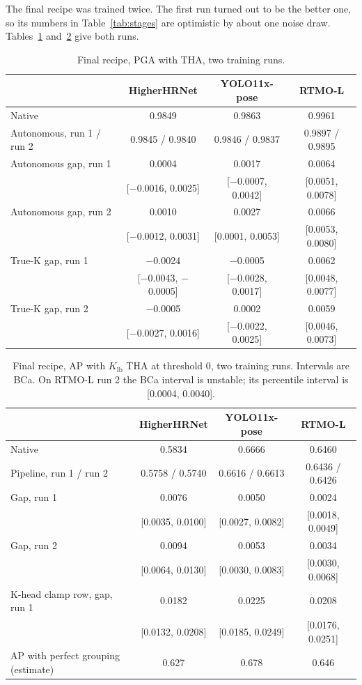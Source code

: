 \documentclass[11pt,a4paper]{article}
\newcommand{\Klb}{K_{\mathrm{lb}}}
\begin{document}
The final recipe was trained twice.
The first run turned out to be the better one, so its numbers in Table~\ref{tab:stages} are optimistic by about one
noise draw.
Tables~\ref{tab:pga} and~\ref{tab:ap} give both runs.

\begin{table}[H]
\centering
\caption{Final recipe, PGA with THA, two training runs.}
\label{tab:pga}
\begin{tabular}{@{}lccc@{}}
\toprule
& HigherHRNet & YOLO11x-pose & RTMO-L \\
\midrule
Native & 0.9849 & 0.9863 & 0.9961 \\
Autonomous, run 1 / run 2 & 0.9845 / 0.9840 & 0.9846 / 0.9837 & 0.9897 / 0.9895 \\
\addlinespace
Autonomous gap, run 1 & 0.0004 & 0.0017 & 0.0064 \\
& [$-$0.0016, 0.0025] & [$-$0.0007, 0.0042] & [0.0051, 0.0078] \\
Autonomous gap, run 2 & 0.0010 & 0.0027 & 0.0066 \\
& [$-$0.0012, 0.0031] & [0.0001, 0.0053] & [0.0053, 0.0080] \\
\addlinespace
True-K gap, run 1 & $-$0.0024 & $-$0.0005 & 0.0062 \\
& [$-$0.0043, $-$0.0005] & [$-$0.0028, 0.0017] & [0.0048, 0.0077] \\
True-K gap, run 2 & $-$0.0005 & 0.0002 & 0.0059 \\
& [$-$0.0027, 0.0016] & [$-$0.0022, 0.0025] & [0.0046, 0.0073] \\
\bottomrule
\end{tabular}
\end{table}

\begin{table}[H]
\centering
\caption{Final recipe, AP with $\Klb$ THA at threshold 0, two training runs. Intervals are BCa.
On RTMO-L run 2 the BCa interval is unstable; its percentile interval is [0.0004, 0.0040].}
\label{tab:ap}
\begin{tabular}{@{}lccc@{}}
\toprule
& HigherHRNet & YOLO11x-pose & RTMO-L \\
\midrule
Native & 0.5834 & 0.6666 & 0.6460 \\
Pipeline, run 1 / run 2 & 0.5758 / 0.5740 & 0.6616 / 0.6613 & 0.6436 / 0.6426 \\
\addlinespace
Gap, run 1 & 0.0076 & 0.0050 & 0.0024 \\
& [0.0035, 0.0100] & [0.0027, 0.0082] & [0.0018, 0.0049] \\
Gap, run 2 & 0.0094 & 0.0053 & 0.0034 \\
& [0.0064, 0.0130] & [0.0030, 0.0083] & [0.0030, 0.0068] \\
\addlinespace
K-head clamp row, gap, run 1 & 0.0182 & 0.0225 & 0.0208 \\
& [0.0132, 0.0208] & [0.0185, 0.0249] & [0.0176, 0.0251] \\
\addlinespace
AP with perfect grouping (estimate) & 0.627 & 0.678 & 0.646 \\
\bottomrule
\end{tabular}
\end{table}
\end{document}
